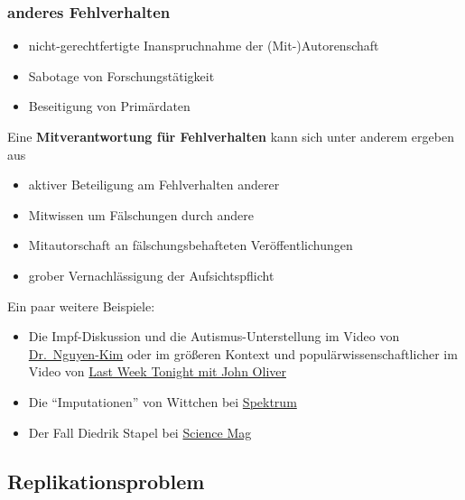 \documentclass[
]{book}
\begin{document}
\hypertarget{anderes-fehlverhalten}{%
\subsubsection{anderes Fehlverhalten}\label{anderes-fehlverhalten}}

\begin{itemize}
\item
  nicht-gerechtfertigte Inanspruchnahme der (Mit-)Autorenschaft
\item
  Sabotage von Forschungstätigkeit
\item
  Beseitigung von Primärdaten
\end{itemize}

Eine \textbf{Mitverantwortung für Fehlverhalten} kann sich unter anderem ergeben aus

\begin{itemize}
\item
  aktiver Beteiligung am Fehlverhalten anderer
\item
  Mitwissen um Fälschungen durch andere
\item
  Mitautorschaft an fälschungsbehafteten Veröffentlichungen
\item
  grober Vernachlässigung der Aufsichtspflicht
\end{itemize}

Ein paar weitere Beispiele:

\begin{itemize}
\item
  Die Impf-Diskussion und die Autismus-Unterstellung im Video von \href{https://www.youtube.com/watch?v=RLbuqWlNFoU}{Dr.~Nguyen-Kim} oder im größeren Kontext und populärwissenschaftlicher im Video von \href{https://www.youtube.com/watch?v=7VG_s2PCH_c}{Last Week Tonight mit John Oliver}
\item
  Die ``Imputationen'' von Wittchen bei \href{https://www.spektrum.de/news/neue-wendung-in-mutmasslichem-forschungsskandal/1636340}{Spektrum}
\item
  Der Fall Diedrik Stapel bei \href{https://www.sciencemag.org/news/2011/12/dutch-researcher-retracts-first-paper-offers-apologies}{Science Mag}
\end{itemize}

\hypertarget{replikationsproblem}{%
\subsection{Replikationsproblem}\label{replikationsproblem}}
\end{document}
